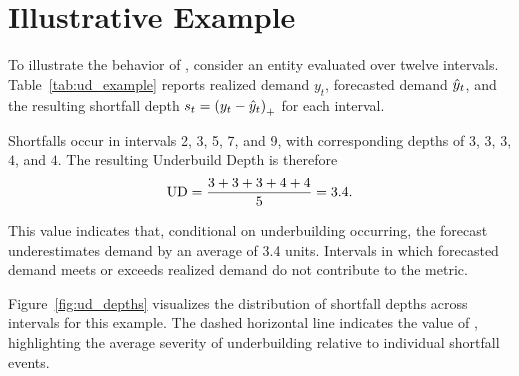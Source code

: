 \section{Illustrative Example}

To illustrate the behavior of \UD, consider an entity evaluated over twelve
intervals. Table~\ref{tab:ud_example} reports realized demand $y_t$, forecasted
demand $\hat{y}_t$, and the resulting shortfall depth
$s_t = \left(y_t - \hat{y}_t\right)_{+}$ for each interval.



Shortfalls occur in intervals 2, 3, 5, 7, and 9, with corresponding depths of
$3$, $3$, $3$, $4$, and $4$. The resulting Underbuild Depth is therefore
\[
\mathrm{UD}
=
\frac{3 + 3 + 3 + 4 + 4}{5}
=
3.4.
\]

This value indicates that, conditional on underbuilding occurring, the forecast
underestimates demand by an average of 3.4 units. Intervals in which forecasted
demand meets or exceeds realized demand do not contribute to the metric.

Figure~\ref{fig:ud_depths} visualizes the distribution of shortfall depths across
intervals for this example. The dashed horizontal line indicates the value of
\UD, highlighting the average severity of underbuilding relative to individual
shortfall events.


